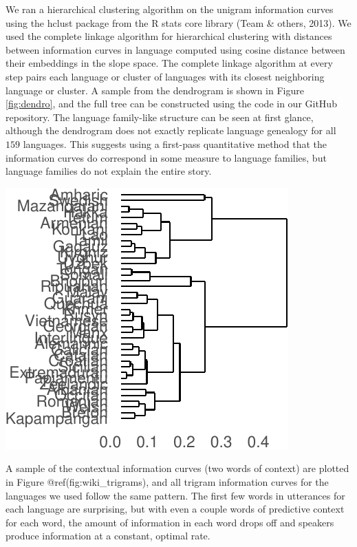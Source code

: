 \documentclass[man,floatsintext]{apa6}
\begin{document}
We ran a hierarchical clustering algorithm on the unigram information curves using the hclust package from the R stats core library (Team \& others, 2013). We used the complete linkage algorithm for hierarchical clustering with distances between information curves in language computed using cosine distance between their embeddings in the slope space. The complete linkage algorithm at every step pairs each language or cluster of languages with its closest neighboring language or cluster. A sample from the dendrogram is shown in Figure \ref{fig:dendro}, and the full tree can be constructed using the code in our GitHub repository. The language family-like structure can be seen at first glance, although the dendrogram does not exactly replicate language genealogy for all \(159\) languages. This suggests using a first-pass quantitative method that the information curves do correspond in some measure to language families, but language families do not explain the entire story.

\includegraphics{figs/dendro-1.pdf}

A sample of the contextual information curves (two words of context) are plotted in Figure @ref(fig:wiki\_trigrams), and all trigram information curves for the languages we used follow the same pattern. The first few words in utterances for each language are surprising, but with even a couple words of predictive context for each word, the amount of information in each word drops off and speakers produce information at a constant, optimal rate.
\end{document}
